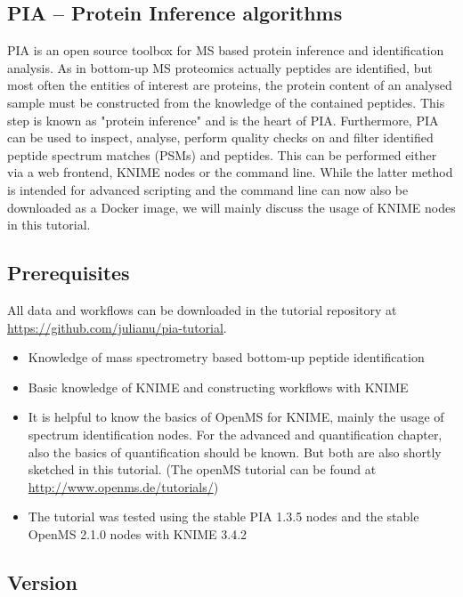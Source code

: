 \documentclass[a4paper,11pt,twoside]{article}
\begin{document}
\subsection{PIA -- Protein Inference algorithms}

PIA is an open source toolbox for MS based protein inference and identification
analysis. As in bottom-up MS proteomics actually peptides are identified, but
most often the entities of interest are proteins, the protein content of an
analysed sample must be constructed from the knowledge of the contained
peptides. This step is known as "protein inference" and is the heart of PIA.
Furthermore, PIA can be used to inspect, analyse, perform quality checks
on and filter identified peptide spectrum matches (PSMs) and peptides. This can
be performed either via a web frontend, KNIME nodes or the command line. While
the latter method is intended for advanced scripting and the command line can
now also be downloaded as a Docker image, we will mainly discuss the usage of
KNIME nodes in this tutorial.


\subsection{Prerequisites}

All data and workflows can be downloaded in the tutorial repository at\\
\url{https://github.com/julianu/pia-tutorial}.

\begin{itemize}
	\item Knowledge of mass spectrometry based bottom-up peptide identification
	\item Basic knowledge of KNIME and constructing workflows with KNIME
	\item It is helpful to know the basics of OpenMS for KNIME, mainly the usage
	of spectrum identification nodes. For the advanced and quantification chapter,
	also the basics of quantification should be known. But both are also shortly
	sketched in this tutorial. (The openMS tutorial can be found at
	\url{http://www.openms.de/tutorials/})
	\item The tutorial was tested using the stable PIA 1.3.5 nodes and the stable
	OpenMS 2.1.0 nodes with KNIME 3.4.2
\end{itemize}

\subsection{Version}
\end{document}
